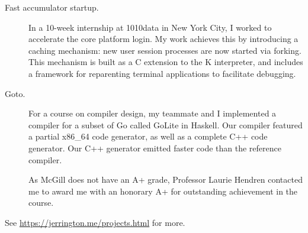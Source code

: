 \documentclass{article}
\begin{document}
\begin{description}
  \item[Fast accumulator startup.]
    In a 10-week internship at 1010data in New York City, I worked to
    accelerate the core platform login.
    My work achieves this by introducing a caching mechanism:
    new user session processes are now started via forking.
    This mechanism is built as a C extension to the K interpreter, and includes
    a framework for reparenting terminal applications to facilitate debugging.

  \item[Goto.]
     For a course on compiler design, my teammate and I implemented a compiler
     for a subset of Go called GoLite in Haskell. Our compiler featured a
     partial x86\_64 code generator, as well as a complete C++ code generator.
     Our C++ generator emitted faster code than the reference compiler.

     As McGill does not have an A+ grade, Professor Laurie Hendren contacted me
     to award me with an honorary A+ for outstanding achievement in the course.
\end{description}

See \url{https://jerrington.me/projects.html} for more.
\end{document}
